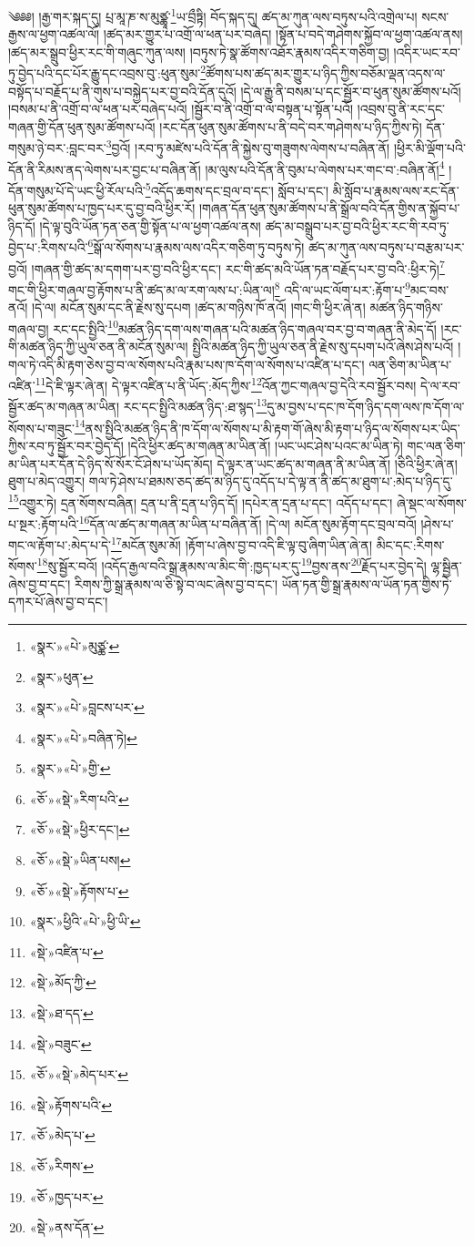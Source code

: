 ༄༅༅། །རྒྱ་གར་སྐད་དུ། པྲ་མཱ་ཎ་ས་མུཙྪཱ་\footnote{«སྣར་»«པེ་»མུཙྪ་}ཡ་བྲྀཏྟི། བོད་སྐད་དུ། ཚད་མ་ཀུན་ལས་བཏུས་པའི་འགྲེལ་པ། སངས་རྒྱས་ལ་ཕྱག་འཚལ་ལོ། །ཚད་མར་གྱུར་པ་འགྲོ་ལ་ཕན་པར་བཞེད། །སྟོན་པ་བདེ་གཤེགས་སྐྱོབ་ལ་ཕྱག་འཚལ་ནས། །ཚད་མར་སྒྲུབ་ཕྱིར་རང་གི་གཞུང་ཀུན་ལས། །བཏུས་ཏེ་སྣ་ཚོགས་འཐོར་རྣམས་འདིར་གཅིག་བྱ། །འདིར་ཡང་རབ་ཏུ་བྱེད་པའི་དང་པོར་རྒྱུ་དང་འབྲས་བུ་:ཕུན་སུམ་\footnote{«སྣར་»ཕུན་}ཚོགས་པས་ཚད་མར་གྱུར་པ་ཉིད་ཀྱིས་བཅོམ་ལྡན་འདས་ལ་བསྟོད་པ་བརྗོད་པ་ནི་གུས་པ་བསྐྱེད་པར་བྱ་བའི་དོན་དུའོ། །དེ་ལ་རྒྱུ་ནི་བསམ་པ་དང་སྦྱོར་བ་ཕུན་སུམ་ཚོགས་པའོ། །བསམ་པ་ནི་འགྲོ་བ་ལ་ཕན་པར་བཞེད་པའོ། །སྦྱོར་བ་ནི་འགྲོ་བ་ལ་བསྟན་པ་སྟོན་པའོ། །འབྲས་བུ་ནི་རང་དང་གཞན་གྱི་དོན་ཕུན་སུམ་ཚོགས་པའོ། །རང་དོན་ཕུན་སུམ་ཚོགས་པ་ནི་བདེ་བར་གཤེགས་པ་ཉིད་ཀྱིས་ཏེ། དོན་གསུམ་ཉེ་བར་:བླང་བར་\footnote{«སྣར་»«པེ་»བླངས་པར་}བྱའོ། །རབ་ཏུ་མཛེས་པའི་དོན་ནི་སྐྱེས་བུ་གཟུགས་ལེགས་པ་བཞིན་ནོ། །ཕྱིར་མི་ལྡོག་པའི་དོན་ནི་རིམས་ནད་ལེགས་པར་བྱང་པ་བཞིན་ནོ། །མ་ལུས་པའི་དོན་ནི་བུམ་པ་ལེགས་པར་གང་བ་:བཞིན་ནོ།\footnote{«སྣར་»«པེ་»བཞིན་ཏེ།} །དོན་གསུམ་པོ་དེ་ཡང་ཕྱི་རོལ་པའི་\footnote{«སྣར་»«པེ་»གྱི་}འདོད་ཆགས་དང་བྲལ་བ་དང་། སློབ་པ་དང་། མི་སློབ་པ་རྣམས་ལས་རང་དོན་ཕུན་སུམ་ཚོགས་པ་ཁྱད་པར་དུ་བྱ་བའི་ཕྱིར་རོ། །གཞན་དོན་ཕུན་སུམ་ཚོགས་པ་ནི་སྒྲོལ་བའི་དོན་གྱིས་ན་སྐྱོབ་པ་ཉིད་དོ། །དེ་ལྟ་བུའི་ཡོན་ཏན་ཅན་གྱི་སྟོན་པ་ལ་ཕྱག་འཚལ་ནས། ཚད་མ་བསྒྲུབ་པར་བྱ་བའི་ཕྱིར་རང་གི་རབ་ཏུ་བྱེད་པ་:རིགས་པའི་\footnote{«ཅོ་»«སྡེ་»རིག་པའི་}སྒོ་ལ་སོགས་པ་རྣམས་ལས་འདིར་གཅིག་ཏུ་བཏུས་ཏེ། ཚད་མ་ཀུན་ལས་བཏུས་པ་བརྩམ་པར་བྱའོ། །གཞན་གྱི་ཚད་མ་དགག་པར་བྱ་བའི་ཕྱིར་དང་། རང་གི་ཚད་མའི་ཡོན་ཏན་བརྗོད་པར་བྱ་བའི་:ཕྱིར་ཏེ།\footnote{«ཅོ་»«སྡེ་»ཕྱིར་དང་།} གང་གི་ཕྱིར་གཞལ་བྱ་རྟོགས་པ་ནི་ཚད་མ་ལ་རག་ལས་པ་:ཡིན་ལ།\footnote{«ཅོ་»«སྡེ་»ཡིན་པས།} འདི་ལ་ཡང་ལོག་པར་:རྟོག་པ་\footnote{«ཅོ་»«སྡེ་»རྟོགས་པ་}མང་བས་ནའོ། །དེ་ལ། མངོན་སུམ་དང་ནི་རྗེས་སུ་དཔག །ཚད་མ་གཉིས་ཁོ་ནའོ། །གང་གི་ཕྱིར་ཞེ་ན། མཚན་ཉིད་གཉིས་གཞལ་བྱ། རང་དང་སྤྱིའི་\footnote{«སྣར་»ཕྱིའི་«པེ་»ཕྱི་ཡི་}མཚན་ཉིད་དག་ལས་གཞན་པའི་མཚན་ཉིད་གཞལ་བར་བྱ་བ་གཞན་ནི་མེད་དོ། །རང་གི་མཚན་ཉིད་ཀྱི་ཡུལ་ཅན་ནི་མངོན་སུམ་ལ། སྤྱིའི་མཚན་ཉིད་ཀྱི་ཡུལ་ཅན་ནི་རྗེས་སུ་དཔག་པའོ་ཞེས་ཤེས་པའོ། །གལ་ཏེ་འདི་མི་རྟག་ཅེས་བྱ་བ་ལ་སོགས་པའི་རྣམ་པས་ཁ་དོག་ལ་སོགས་པ་འཛིན་པ་དང་། ལན་ཅིག་མ་ཡིན་པ་འཛིན་\footnote{«སྡེ་»འཛིན་པ་}དེ་ཇི་ལྟར་ཞེ་ན། དེ་ལྟར་འཛིན་པ་ནི་ཡོད་:མོད་ཀྱིས་\footnote{«སྡེ་»མོད་ཀྱི་}འོན་ཀྱང་གཞལ་བྱ་དེའི་རབ་སྦྱོར་བས། དེ་ལ་རབ་སྦྱོར་ཚད་མ་གཞན་མ་ཡིན། རང་དང་སྤྱིའི་མཚན་ཉིད་:ཐ་སྙད་\footnote{«སྡེ་»ཐ་དད་}དུ་མ་བྱས་པ་དང་ཁ་དོག་ཉིད་དག་ལས་ཁ་དོག་ལ་སོགས་པ་གཟུང་\footnote{«སྡེ་»བཟུང་}ནས་སྤྱིའི་མཚན་ཉིད་ནི་ཁ་དོག་ལ་སོགས་པ་མི་རྟག་གོ་ཞེས་མི་རྟག་པ་ཉིད་ལ་སོགས་པར་ཡིད་ཀྱིས་རབ་ཏུ་སྦྱོར་བར་བྱེད་དོ། །དེའི་ཕྱིར་ཚད་མ་གཞན་མ་ཡིན་ནོ། །ཡང་ཡང་ཤེས་པའང་མ་ཡིན་ཏེ། གང་ལན་ཅིག་མ་ཡིན་པར་དོན་དེ་ཉིད་སོ་སོར་ངོ་ཤེས་པ་ཡོད་མོད། དེ་ལྟར་ན་ཡང་ཚད་མ་གཞན་ནི་མ་ཡིན་ནོ། །ཅིའི་ཕྱིར་ཞེ་ན། ཐུག་པ་མེད་འགྱུར། གལ་ཏེ་ཤེས་པ་ཐམས་ཅད་ཚད་མ་ཉིད་དུ་འདོད་པ་དེ་ལྟ་ན་ནི་ཚད་མ་ཐུག་པ་:མེད་པ་ཉིད་དུ་\footnote{«ཅོ་»«སྡེ་»མེད་པར་}འགྱུར་ཏེ། དྲན་སོགས་བཞིན། དྲན་པ་ནི་དྲན་པ་ཉིད་དོ། །དཔེར་ན་དྲན་པ་དང་། འདོད་པ་དང་། ཞེ་སྡང་ལ་སོགས་པ་སྔར་:རྟོག་པའི་\footnote{«སྡེ་»རྟོགས་པའི་}དོན་ལ་ཚད་མ་གཞན་མ་ཡིན་པ་བཞིན་ནོ། །དེ་ལ། མངོན་སུམ་རྟོག་དང་བྲལ་བའོ། །ཤེས་པ་གང་ལ་རྟོག་པ་:མེད་པ་དེ་\footnote{«ཅོ་»མེད་པ་}མངོན་སུམ་མོ། །རྟོག་པ་ཞེས་བྱ་བ་འདི་ཇི་ལྟ་བུ་ཞིག་ཡིན་ཞེ་ན། མིང་དང་:རིགས་སོགས་\footnote{«ཅོ་»རིགས་}སུ་སྦྱོར་བའོ། །འདོད་རྒྱལ་བའི་སྒྲ་རྣམས་ལ་མིང་གི་:ཁྱད་པར་དུ་\footnote{«ཅོ་»ཁྱད་པར་}བྱས་ནས་\footnote{«སྡེ་»ནས་དོན་}རྗོད་པར་བྱེད་དེ། ལྷ་སྦྱིན་ཞེས་བྱ་བ་དང་། རིགས་ཀྱི་སྒྲ་རྣམས་ལ་ཅི་སྟེ་བ་ལང་ཞེས་བྱ་བ་དང་། ཡོན་ཏན་གྱི་སྒྲ་རྣམས་ལ་ཡོན་ཏན་གྱིས་ཏེ་དཀར་པོ་ཞེས་བྱ་བ་དང་། 